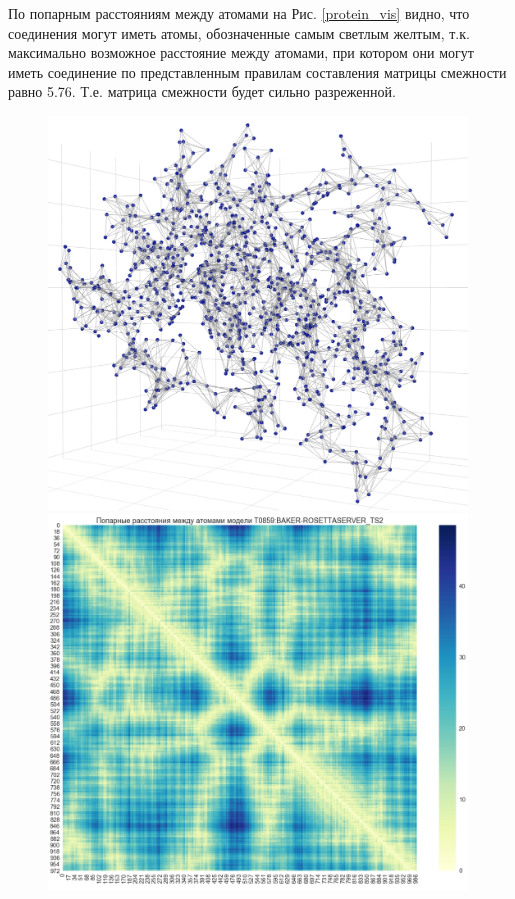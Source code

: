 \documentclass[14pt]{extarticle}
\begin{document}
По попарным расстояниям между атомами на Рис. \ref{protein_vis} видно, что соединения могут иметь атомы, обозначенные самым светлым желтым, т.к. максимально возможное расстояние между атомами, при котором они могут иметь соединение по представленным правилам составления матрицы смежности равно 5.76. Т.е. матрица смежности будет сильно разреженной.
	\begin{figure}[H]
	\centering
	\begin{minipage}[b]{0.49\textwidth}
		\centering
		\includegraphics[width=0.99\textwidth]{3d_graph.pdf}
	\end{minipage}
	\begin{minipage}[b]{0.49\textwidth}
		\centering
		\includegraphics[width=0.99\textwidth]{pairwise.pdf}

\end{minipage}
\end{figure}
\end{document}
